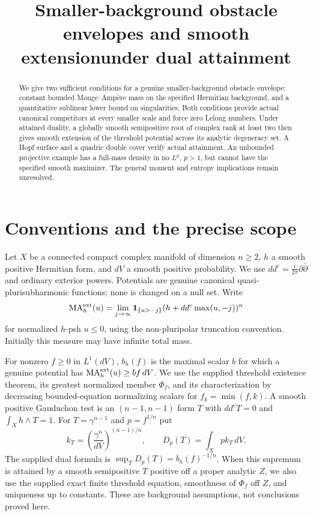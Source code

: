 \documentclass[11pt]{article}
\title{Smaller-background obstacle envelopes and smooth extension\newline under dual attainment}
\author{}
\date{}
\newcommand{\ddc}{dd^c}
\newcommand{\MA}{\operatorname{MA}}
\newcommand{\1}{\mathbf 1}
\theoremstyle{remark}\newtheorem{remark}[theorem]{Remark}
\begin{document}
\maketitle
\begin{abstract}
We give two sufficient conditions for a genuine smaller-background obstacle
envelope: constant bounded Monge--Amp\`ere mass on the specified Hermitian
background, and a quantitative sublinear lower bound on singularities.
Both conditions provide actual canonical competitors at every smaller scale
and force zero Lelong numbers. Under attained duality, a globally smooth
semipositive root of complex rank at least two then gives smooth extension of
the threshold potential across its analytic degeneracy set. A Hopf surface
and a quadric double cover verify actual attainment. An unbounded projective
example has a full-mass density in no $L^p$, $p>1$, but cannot have the
specified smooth maximizer. The general moment and entropy implications
remain unresolved.
\end{abstract}

\section{Conventions and the precise scope}
Let $X$ be a connected compact complex manifold of dimension $n\geq2$,
$h$ a smooth positive Hermitian form, and $dV$ a smooth positive probability.
We use $\ddc=\frac{i}{2\pi}\partial\bar\partial$ and ordinary exterior
powers. Potentials are genuine canonical quasi-plurisubharmonic functions;
none is changed on a null set. Write
\[
 \MA_h^{\rm ext}(u)=\lim_{j\to\infty}
 \1_{\{u>-j\}}(h+\ddc\max(u,-j))^n
\]
for normalized $h$-psh $u\leq0$, using the non-pluripolar truncation
convention. Initially this measure may have infinite total mass.

For nonzero $f\geq0$ in $L^1(dV)$, $b_h(f)$ is the maximal scalar $b$
for which a genuine potential has $\MA_h^{\rm ext}(u)\geq bf\,dV$.
We use the supplied threshold existence theorem, its greatest normalized
member $\Phi_f$, and its characterization by decreasing bounded-equation
normalizing scalars for $f_k=\min(f,k)$.
A smooth positive Gauduchon test is an $(n-1,n-1)$ form $T$ with
$\ddc T=0$ and $\int_Xh\wedge T=1$.
For $T=\gamma^{n-1}$ and $p=f^{1/n}$ put
\[
 k_T=\left(\frac{\gamma^n}{dV}\right)^{(n-1)/n},\qquad
 D_p(T)=\int_Xp k_T\,dV.
\]
The supplied dual formula is $\sup_T D_p(T)=b_h(f)^{-1/n}$.
When this supremum is attained by a smooth semipositive $T$ positive off a
proper analytic $Z$, we also use the supplied exact finite threshold equation,
smoothness of $\Phi_f$ off $Z$, and uniqueness up to constants.
These are background assumptions, not conclusions proved here.
\end{document}
